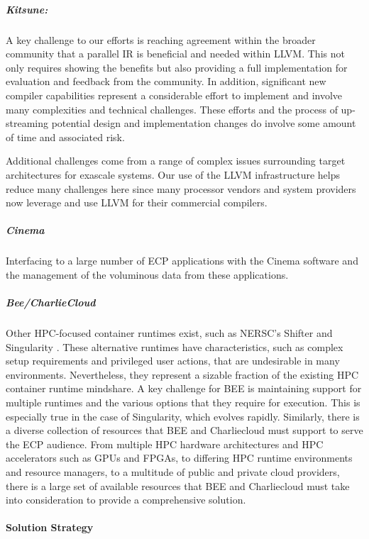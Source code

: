\subparagraph{Kitsune:}
A key challenge to our efforts is reaching agreement within the
broader community that a parallel IR is
beneficial and needed within LLVM.  This not only requires showing the
benefits but also providing a full implementation for evaluation and
feedback from the community.  In addition, significant new compiler
capabilities represent a considerable effort to implement and involve
many complexities and technical challenges.  These efforts and the
process of up-streaming potential design and implementation changes do
involve some amount of time and associated risk.

Additional challenges come from a range of complex issues surrounding
target architectures for exascale systems.  Our use of the LLVM
infrastructure helps reduce many challenges here since many processor
vendors and system providers now leverage and use LLVM for their
commercial compilers.

\subparagraph{Cinema}
Interfacing to a large number of ECP applications with the Cinema
software and the management of the voluminous data from these
applications. 

\subparagraph{Bee/CharlieCloud}
Other HPC-focused container runtimes exist, such as NERSC's Shifter
\cite{canonrsjacobsend} and
Singularity \cite{kurtzergmsochatvbauermw}.  These alternative runtimes have characteristics, such as
complex setup requirements and privileged user actions, that are undesirable in
many environments.  Nevertheless, they represent a sizable fraction of the
existing HPC container runtime mindshare.  A key challenge for BEE is
maintaining support for multiple runtimes and the various options that they require
for execution.  This is especially true in the case of Singularity, which
evolves rapidly.  Similarly, there is a diverse collection of resources that
BEE and Charliecloud must support to serve the ECP audience.  From multiple HPC
hardware architectures and HPC accelerators such as GPUs and FPGAs, to
differing HPC runtime environments and resource managers, to a multitude of
public and private cloud providers, there is a large set of available resources
that BEE and Charliecloud must take into consideration to provide a
comprehensive solution.

\paragraph{Solution Strategy} \leavevmode \\

